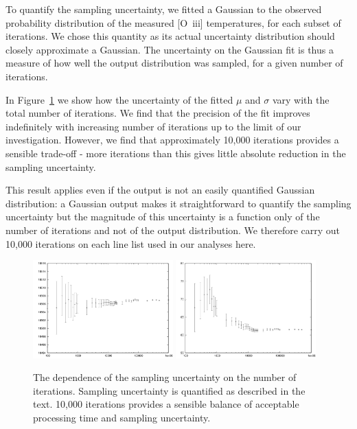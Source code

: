 \documentclass[useAMS,usenatbib]{mn2e}
\begin{document}
To quantify the sampling uncertainty, we fitted a Gaussian to the observed probability distribution of the measured [O~{\sc iii}] temperatures, for each subset of iterations.  We chose this quantity as its actual uncertainty distribution should closely approximate a Gaussian.  The uncertainty on the Gaussian fit is thus a measure of how well the output distribution was sampled, for a given number of iterations.

In Figure~\ref{samplefigure1} we show how the uncertainty of the fitted $\mu$ and $\sigma$ vary with the total number of iterations.  We find that the precision of the fit improves indefinitely with increasing number of iterations up to the limit of our investigation.  However, we find that approximately 10,000 iterations provides a sensible trade-off - more iterations than this gives little absolute reduction in the sampling uncertainty.

This result applies even if the output is not an easily quantified Gaussian distribution: a Gaussian output makes it straightforward to quantify the sampling uncertainty but the magnitude of this uncertainty is a function only of the number of iterations and not of the output distribution.  We therefore carry out 10,000 iterations on each line list used in our analyses here.

\begin{figure}
\includegraphics[width=0.48\textwidth]{figures/mulogx.png}
\includegraphics[width=0.48\textwidth]{figures/sigmalogx.png}
\caption{The dependence of the sampling uncertainty on the number of iterations.  Sampling uncertainty is quantified as described in the text.  10,000 iterations provides a sensible balance of acceptable processing time and sampling uncertainty.}
\label{samplefigure1}
\end{figure}
\end{document}
